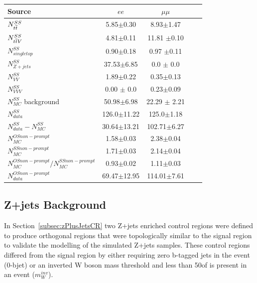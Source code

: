 \begin{table}[h]
\centering
\begin{tabular}{l | cccc}
\hline
Source &  $ee$ & $\mu\mu$  \\ 
\hline
$N_{t\overline{t}}^{SS}$ & 5.85$\pm$0.30 & 8.93$\pm$1.47    \\
$N_{t\overline{t} V}^{SS}$ & 4.81$\pm$0.11 & 11.81 $\pm$0.10  \\ 
$N_{single top}^{SS}$ & 0.90$\pm$0.18 & 0.97 $\pm$0.11    \\
$N_{Z+jets}^{SS}$ & 37.53$\pm$6.85 & 0.0 $\pm$ 0.0  \\
$N_{VV}^{SS}$ & 1.89$\pm$0.22 & 0.35$\pm$0.13 \\
$N_{VVV}^{SS}$ & 0.00 $\pm$ 0.0 & 0.23$\pm$0.09 \\
\hline
$N_{MC}^{SS}$ background & 50.98$\pm$6.98 & 22.29 $\pm$ 2.21 \\ 
$N_{data}^{SS}$ & 126.0$\pm$11.22 & 125.0$\pm$1.18\\ 
\hline
$N_{data}^{SS} - N_{MC}^{SS}$ & 30.64$\pm$13.21 & 102.71$\pm$6.27\\
\hline
$N_{MC}^{OS non-prompt}$ & 1.58$\pm$0.03 & 2.38$\pm$0.04 \\
$N_{MC}^{SS non-prompt}$ & 1.71$\pm$0.03 & 2.14$\pm$0.04 \\
$N_{MC}^{OS non-prompt}/N_{MC}^{SS non-prompt}$ & 0.93$\pm$0.02 & 1.11$\pm$0.03 \\
\hline
$N_{data}^{OS non-prompt}$ & 69.47$\pm$12.95 & 114.01$\pm$7.61 \\
\hline
\end{tabular}
\label{tab:fakeLeptonYields}
\end{table}

\subsection{Z+jets Background}\label{subsec:zPlusJetsEstimation}
In Section~\ref{subsec:zPlusJetsCR} two Z+jets enriched control regions were defined to produce orthogonal regions that were topologically similar to the signal region to validate the modelling of the simulated Z+jets samples.
These control regions differed from the signal region by either requiring zero b-tagged jets in the event (0-bjet) or an inverted W boson mass threshold and less than 50\GeV of \MET is present in an event ($m_{W}^{inv}$).

